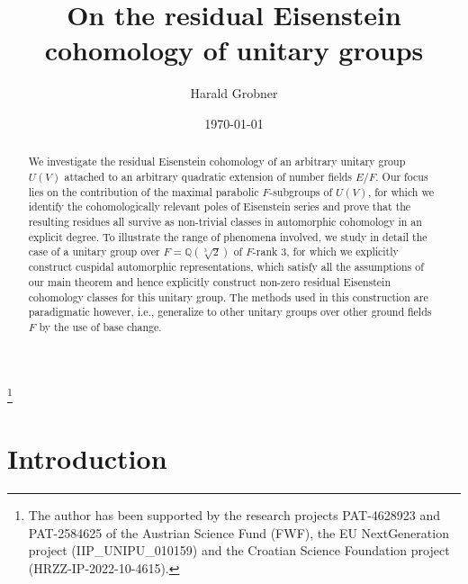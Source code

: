 \documentclass[a4paper,10pt]{amsart}
\theoremstyle{definition}
\numberwithin{equation}{section}
\def\Q{\mathbb Q}
\begin{document}
\title{On the residual Eisenstein cohomology of unitary groups}
\author{Harald Grobner}
\thanks{The author has been supported by the research projects PAT-4628923 and PAT-2584625 of the Austrian Science Fund (FWF), the EU NextGeneration project (IIP\_UNIPU\_010159) and the Croatian Science Foundation project (HRZZ-IP-2022-10-4615).}
\address{Harald Grobner, Faculty of Mathematics, University of Vienna, Oskar-Morgenstern-Platz 1, A-1090 Vienna, Austria}


\date{\today}

\maketitle

 
\begin{abstract}
We investigate the residual Eisenstein cohomology of an arbitrary unitary group $U(V)$ attached to an arbitrary quadratic extension of number fields $E/F$. Our focus lies on the contribution of the maximal parabolic $F$-subgroups of $U(V)$, for which we identify the cohomologically relevant poles of Eisenstein series and prove that the resulting residues all survive as non-trivial classes in automorphic cohomology in an explicit degree. To illustrate the range of phenomena involved, we study in detail the case of a unitary group over $F=\Q(\sqrt[3]{2})$ of $F$-rank $3$, for which we explicitly construct cuspidal automorphic representations, which satisfy all the assumptions of our main theorem and hence explicitly construct non-zero residual Eisenstein cohomology classes for this unitary group. The methods used in this construction are paradigmatic however, i.e., generalize to other unitary groups over other ground fields $F$ by the use of base change.
\end{abstract}

\vskip 10pt

\setcounter{tocdepth}{2}
\tableofcontents




\section*{Introduction}
\end{document}
